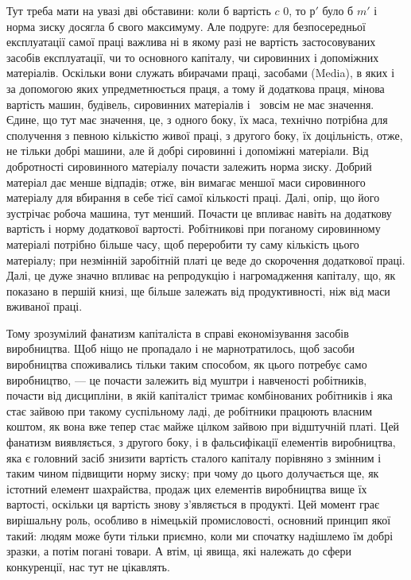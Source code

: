 Тут треба мати на увазі дві обставини: коли б вартість $c$ \deq{} 0,
то $р'$ було б \deq{} $m'$ і норма зиску досягла б свого максимуму.
Але подруге: для безпосередньої експлуатації самої праці важлива
ні в якому разі не вартість застосовуваних засобів експлуатації,
чи то основного капіталу, чи сировинних і допоміжних
матеріалів. Оскільки вони служать вбирачами праці, засобами
(Media), в яких і за допомогою яких упредметнюється праця,
а тому й додаткова праця, мінова вартість машин, будівель,
сировинних матеріалів і~ зовсім не має значення. Єдине, що
тут має значення, це, з одного боку, їх маса, технічно потрібна
для сполучення з певною кількістю живої праці, з другого боку,
їх доцільність, отже, не тільки добрі машини, але й добрі сировинні
і допоміжні матеріали. Від добротності сировинного матеріалу
почасти залежить норма зиску. Добрий матеріал дає менше
відпадів; отже, він вимагає меншої маси сировинного матеріалу
для вбирання в себе тієї самої кількості праці. Далі, опір, що
його зустрічає робоча машина, тут менший. Почасти це впливає
навіть на додаткову вартість і норму додаткової вартості. Робітникові
при поганому сировинному матеріалі потрібно більше
часу, щоб переробити ту саму кількість цього матеріалу; при
незмінній заробітній платі це веде до скорочення додаткової
праці. Далі, це дуже значно впливає на репродукцію і нагромадження
капіталу, що, як показано в першій книзі, ще більше залежать від продуктивності, ніж від маси вживаної
праці.

Тому зрозумілий фанатизм капіталіста в справі економізування
засобів виробництва. Щоб ніщо не пропадало і не марнотратилось,
щоб засоби виробництва споживались тільки таким
способом, як цього потребує само виробництво, — це почасти
залежить від муштри і навченості робітників, почасти від дисципліни,
в якій капіталіст тримає комбінованих робітників і яка стає
зайвою при такому суспільному ладі, де робітники працюють
власним коштом, як вона вже тепер стає майже цілком зайвою
при відштучній платі. Цей фанатизм виявляється, з другого боку,
і в фальсифікації елементів виробництва, яка є головний засіб
знизити вартість сталого капіталу порівняно з змінним і таким
чином підвищити норму зиску; при чому до цього долучається
ще, як істотний елемент шахрайства, продаж цих елементів
виробництва вище їх вартості, оскільки ця вартість знову з’являється
в продукті. Цей момент грає вирішальну роль, особливо
в німецькій промисловості, основний принцип якої такий: людям
може бути тільки приємно, коли ми спочатку надішлемо їм добрі
зразки, а потім погані товари. А втім, ці явища, які належать до
сфери конкуренції, нас тут не цікавлять.

